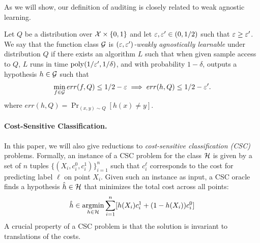 As we will show, our definition of auditing is closely related to  weak
agnostic learning.

\begin{definition}
  Let $Q$ be a distribution over $\mathcal{X}\times\{0, 1\}$ and let
  $\varepsilon, \varepsilon' \in (0, 1/2)$ such that $\varepsilon \geq \varepsilon'$. We say that
  the function class $\mathcal{G}$ is \emph{$(\varepsilon , \varepsilon')$-weakly
    agnostically learnable} under distribution $Q$ if there exists an
  algorithm $L$ such that when given sample access to $Q$, $L$ runs in
  time $\operatorname{poly}(1/\varepsilon', 1/\delta)$, and with probability $1 - \delta$,
  outputs a hypothesis $h\in \mathcal{G}$ such that
  \[
    \min_{f\in\mathcal{G}} err(f, Q) \leq 1/2 - \varepsilon \implies err(h, Q) \leq
    1/2 - \varepsilon'.
  \]
  where $err(h,Q) = \Pr_{(x,y) \sim Q}[h(x) \neq y]$.
\end{definition}

\paragraph{Cost-Sensitive Classification.}
In this paper, we will also give reductions to \emph{cost-sensitive classification
  (CSC)} problems. Formally, an instance of a CSC problem for the
class $\mathcal{H}$ is given by a set of $n$ tuples
$\{(X_i, c_i^0, c_i^1)\}_{i=1}^n$ such that $c_i^\ell$ corresponds to
the cost for predicting label $\ell$ on point $X_i$. Given such an
instance as input, a CSC oracle finds a hypothesis $\hat h \in \mathcal{H}$ that
minimizes the total cost across all points:
\begin{equation}
  \hat h \in \operatorname*{\mathrm{argmin}}_{h\in \mathcal{H}} \sum_{i = 1}^n [h(X_i) c_i^1 + (1 -
  h(X_i)) c_i^0]\label{csc}
\end{equation}
A crucial property of a CSC problem is that the solution is invariant
to translations of the costs.



